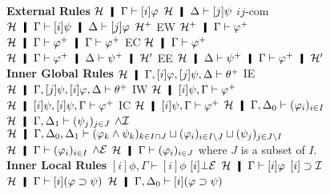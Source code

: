 {%




\begin{figure}
 \small
\centering
  \textbf{External Rules}
   \vskip 2mm
   \BinaryRule
   {$\hyper\hmid\G\vdash[i]\phi$}
   {$\hyper\hmid\D\vdash[j]\psi$}
   {$ij$-com}
   {$\hyper\hmid\Gamma\vdash[i]\psi\hmid\Delta\vdash[j]\varphi$}
  \hfill
 \UnaryRule
 {$\mathcal{H}^+$}
 {EW}
 {$\hyper^+\hmid\Gamma\vdash \m\varphi$}
 \UnaryRule
 {$\hyper\hmid\Gamma\vdash \m\phi\hmid\Gamma\vdash \m\phi$}
 {EC}
 {$\hyper\hmid\Gamma\vdash \m\phi$}
 \hfill
 \UnaryRule
 {$\hyper\hmid\Gamma\vdash \m\varphi\hmid\Delta\vdash \m\psi\hmid \hyper'$}
 {EE}
 {$\hyper\hmid\Delta\vdash \m\psi   \hmid\Gamma\vdash \m\varphi\hmid
   \hyper'$}
\textbf{Inner Global Rules}
   \UnaryRule
   {$\hyper\hmid\Gamma,[i]\phi,[j]\psi,\Delta\tr\m\theta$}
   {IE}
   {$\hyper\hmid\Gamma,[j]\psi,[i]\phi,\Delta\tr\m\theta$}
   \hfill
   \UnaryRule{$\hyper\hmid\Gamma\vdash\m\varphi$}
   {IW}
   {$\hyper\hmid[i]\psi,\Gamma\vdash\m\varphi$}
   \hfill
   \UnaryRule
   {$\hyper\hmid[i]\psi,[i]\psi,\G\vdash\m\varphi$}
   {IC}
   {$\hyper\hmid[i]\psi,        \G\vdash\m\varphi$}
 \BinaryRule
 {$\hyper\hmid\G,\D_0\tr(\phi_i)_{i\in I}$}
 {$\hyper\hmid\G,\D_1\tr(\psi_j)_{j\in J}$}
 {$\wedge\mathcal I$}
 {$\hyper\hmid\G,\D_0,\D_1\tr(\phi_k\land\psi_k)_{k\in I\cap J}\sqcup
 (\phi_i)_{i\in I\setminus J}\sqcup (\psi_j)_{j\in J\setminus I}$}
 \UnaryRule
 {$\hyper\hmid \G\tr(\phi_i)_{i\in I}$}
 {$\wedge\mathcal E$}
 {$\hyper\hmid \G\tr(\phi_i)_{i\in J}$}
 where $J$ is a subset of $I$.
\textbf{Inner Local Rules}
   {$[i]\phi,\Gamma\vdash [i]\phi$}
   \hfill
 \UnaryRule{$\hyper\hmid\Gamma\vdash[i]\bot$}
   {$[i]\bot\mathcal E$}
   {$\hyper\hmid\Gamma\vdash[i]\phi$}
  \UnaryRule{$\hyper\hmid[i]\varphi,\G\vdash [i]\psi$}
  {$[i]\supset\mathcal I$}
  {$\hyper\hmid\G\vdash [i](\varphi\supset \psi)$}
  \hfill
  \BinaryRule
  {$\hyper\hmid\G,\D_0\vdash [i](\phi\imp\psi)$}

\end{figure}}
